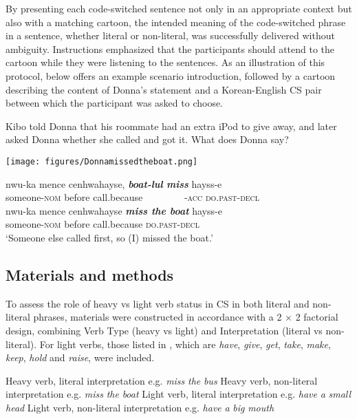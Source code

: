 By presenting each code-switched sentence not only in an appropriate context but also with a matching cartoon, the intended meaning of the code-switched phrase in a sentence, whether literal or non-literal, was successfully delivered without ambiguity. Instructions emphasized that the participants should attend to the cartoon while they were listening to the sentences. As an illustration of this protocol,  below offers an example scenario introduction, followed by a cartoon describing the content of Donna’s statement and a Korean-English \ac{CS} pair between which the participant was asked to choose. 

\ea\label{ex:35} 
Kibo told Donna that his roommate had an extra iPod to give away, and later asked Donna whether she called and got it. What does Donna say?
\sn \begin{center} \texttt{[image: figures/Donnamissedtheboat.png]} \end{center}
\ea \gll nwu-ka mence cenhwahayse, \textbf{\textit{boat-lul} \textit{miss}} hayss-e \\
someone-\textsc{nom} before call.because {~~~~~~~~}-\textsc{acc} \textsc{do.past-decl} \\
\ex  \gll nwu-ka mence cenhwahayse \textbf{\textit{miss the boat}} hayss-e \\
someone-\textsc{nom} before call.because  {} \textsc{do.past-decl} \\
\glt `Someone else called first, so (I) missed the boat.'
\z
\z

\subsection{Materials and methods}\label{ch2:sect:2.1.1}

To assess the role of heavy vs light verb status in \ac{CS} in both literal and non-literal phrases, materials were constructed in accordance with a 2 × 2 factorial design, combining Verb Type (heavy vs light) and Interpretation (literal vs non-literal). For light verbs, those listed in , which are \textit{have}, \textit{give}, \textit{get}, \textit{take}, \textit{make}, \textit{keep}, \textit{hold} and \textit{raise}, were included.

\ea\label{ex:36}
    \ea Heavy verb, literal interpretation   \hfill  e.g. \textit{miss} \textit{the} \textit{bus}
    \ex Heavy verb, non-literal interpretation \hfill e.g. \textit{miss} \textit{the} \textit{boat}
    \ex Light verb, literal interpretation  \hfill e.g. \textit{have} \textit{a} \textit{small} \textit{head}
    \ex  Light verb, non-literal interpretation \hfill e.g. \textit{have} \textit{a} \textit{big} \textit{mouth}
    \z
\z

